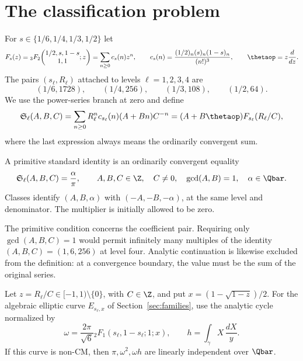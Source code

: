 \section{The classification problem}

For $s\in\{1/6,1/4,1/3,1/2\}$ let
\[
 F_s(z)={}_3F_2\!\left(\begin{matrix}1/2,s,1-s\\1,1\end{matrix};z\right)
       =\sum_{n\ge0}c_s(n)z^n,
 \qquad c_s(n)=\frac{(1/2)_n(s)_n(1-s)_n}{(n!)^3},
 \qquad\thetaop=z\frac d{dz}.
\]
The pairs $(s_\ell,R_\ell)$ attached to levels $\ell=1,2,3,4$ are
\[
 (1/6,1728),\qquad(1/4,256),\qquad(1/3,108),\qquad(1/2,64).
\]
We use the power-series branch at zero and define
\begin{equation}\label{eq:series}
 \mathfrak S_\ell(A,B,C)
  =\sum_{n\ge0}R_\ell^nc_{s_\ell}(n)(A+Bn)C^{-n}
  =(A+B\thetaop)F_{s_\ell}(R_\ell/C),
\end{equation}
where the last expression always means the ordinarily convergent sum.

\begin{definition}
A primitive standard identity is an ordinarily convergent equality
\[
 \mathfrak S_\ell(A,B,C)=\frac\alpha\pi,
 \qquad A,B,C\in\Z,\quad C\ne0,\quad\gcd(A,B)=1,
 \quad\alpha\in\Qbar.
\]
Classes identify $(A,B,\alpha)$ with $(-A,-B,-\alpha)$, at the same
level and denominator. The multiplier is initially allowed to be zero.
\end{definition}

The primitive condition concerns the coefficient pair. Requiring only
$\gcd(A,B,C)=1$ would permit infinitely many multiples of the identity
$(A,B,C)=(1,6,256)$ at level four. Analytic continuation is likewise
excluded from the definition: at a convergence boundary, the value must
be the sum of the original series.

\begin{hypothesis}\label{hyp:QPI}
Let $z=R_\ell/C\in[-1,1)\setminus\{0\}$, with $C\in\Z$, and put
$x=(1-\sqrt{1-z})/2$. For the algebraic elliptic curve $E_{s_\ell,x}$
of Section~\ref{sec:families}, use the analytic cycle normalized by
\[
 \omega=\frac{2\pi}{\sqrt6}
 {}_2F_1(s_\ell,1-s_\ell;1;x),
 \qquad h=\int_\gamma X\,\frac{dX}{y}.
\]
If this curve is non-CM, then $\pi,\omega^2,\omega h$ are linearly
independent over $\Qbar$.
\end{hypothesis}

